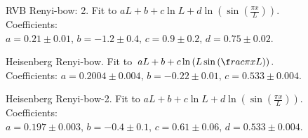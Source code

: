 \documentclass[prl,aps,twocolumn,floatfix,amsmath,amssymb,superscriptaddress,tightenlines]{revtex4}
\begin{document}
\begin{figure}[h]
  \begin{center}
  \end{center}
  \caption{RVB Renyi-bow: 2. Fit to $a L + b + c \ln L + d \ln \left( \sin \left
( \frac{\pi x}{L} \right) \right).$ Coefficients: $a = 0.21\pm 0.01, \, b = -1.2
 \pm 0.4, \, c = 0.9\pm 0.2, \, d = 0.75 \pm 0.02$.}
  \label{fig:2}
\end{figure}

\begin{figure}[h]
  \begin{center}
  \end{center}
  \caption{Heisenberg Renyi-bow. Fit to $a L + b + c \ln \left( L \sin \left( \f
rac{\pi x}{L} \right) \right).$ Coefficients: $a = 0.2004\pm 0.004, \, b = -0.22
 \pm 0.01, \, c = 0.533\pm 0.004$.}
  \label{fig:3}
\end{figure}

\begin{figure}[h]
  \begin{center}
  \end{center}
  \caption{Heisenberg Renyi-bow-2. Fit to $a L + b + c \ln L + d \ln \left( \sin
 \left( \frac{\pi x}{L} \right) \right).$ Coefficients: $a = 0.197\pm 0.003, \, 
b = -0.4 \pm 0.1, \, c = 0.61\pm 0.06, \, d = 0.533 \pm 0.004$.}
  \label{fig:4}
\end{figure}







\end{document}
